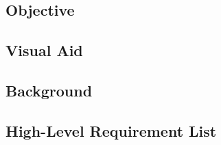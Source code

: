 \subsection{Objective}

\subsection{Visual Aid}

\subsection{Background}

\subsection{High-Level Requirement List}